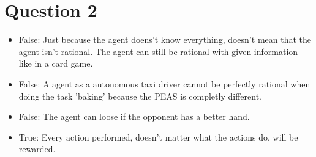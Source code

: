\documentclass[a4paper]{scrartcl}
\begin{document}
\section*{Question 2}
	\begin{itemize}
		\item False: Just because the agent doens't know everything, doesn't
		mean that the agent isn't rational. The agent can still be rational with
		given information like in a card game.
		\item False: A agent as a autonomous taxi driver cannot be perfectly
		rational when doing the task 'baking' because the PEAS is completly
		different. 
		\item False: The agent can loose if the opponent has a better hand.
		\item True: Every action performed, doesn't matter what the actions do,
		will be rewarded. 
	\end{itemize}
\end{document}
